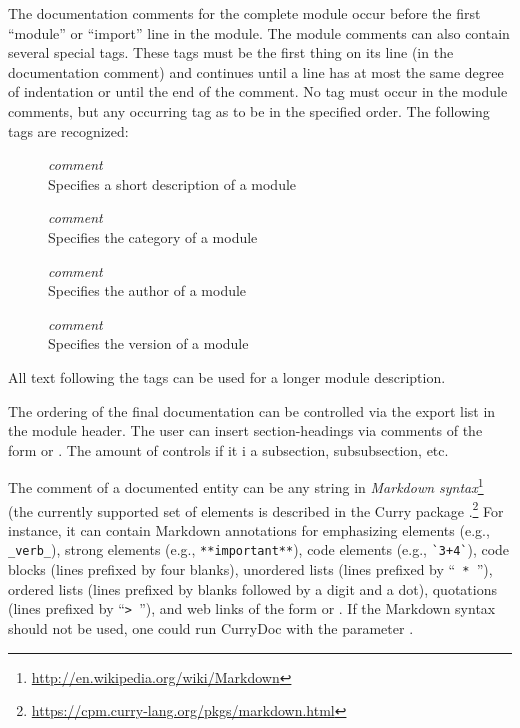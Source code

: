The documentation comments for the complete module occur before
the first ``module'' or ``import'' line in the module.
The module comments can also contain several special tags. These tags
must be the first thing on its line (in the documentation comment)
and continues until a line has at most the same degree of indentation or
until the end of the comment.
No tag must occur in the module comments, but any
occurring tag as to be in the specified order.
The following tags are recognized:
\begin{description}
\item[] \emph{comment}\\
Specifies a short description of a module
\item[] \emph{comment}\\
Specifies the category of a module
\item[] \emph{comment}\\
Specifies the author of a module
\item[] \emph{comment}\\
Specifies the version of a module
\end{description}
All text following the tags can be used for a longer module description.

The ordering of the final documentation can be controlled via the export list
in the module header.
The user can insert section-headings via comments of the form \ccode{-{}- *} or
\ccode{\{- * }. The amount of \* controls if it i a subsection,
subsubsection, etc.

The comment of a documented entity can be any string in
\emph{Markdown syntax}\footnote{%
\url{http://en.wikipedia.org/wiki/Markdown}}
(the currently supported set of elements is described in the
Curry package .\footnote{%
\url{https://cpm.curry-lang.org/pkgs/markdown.html}}
For instance, it can contain Markdown annotations for
emphasizing elements (e.g., \verb!_verb_!),
strong elements (e.g., \verb!**important**!),
code elements (e.g., \verb!`3+4`!), code blocks (lines prefixed by four blanks),
unordered lists (lines prefixed by  ``\verb! * !''),
ordered lists (lines prefixed by blanks followed by a digit and a dot),
quotations (lines prefixed by ``\verb!> !''),
and web links of the form 
or .
If the Markdown syntax should not be used, one could run CurryDoc
with the parameter .

